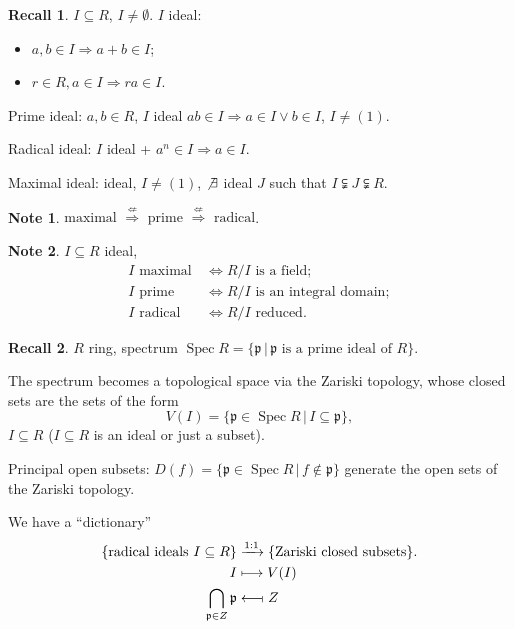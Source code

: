\documentclass[12pt]{article}
\DeclareMathOperator{\Spec}{Spec}
\theoremstyle{definition}
\newtheorem*{note}{Note}
\newtheorem*{recall}{Recall}
\theoremstyle{remark}
\begin{document}
\begin{recall}
$I\subseteq R$, $I\neq\emptyset$. $I$ ideal:
\begin{itemize}
\item $a,b\in I\Rightarrow a+b\in I$;
\item $r\in R,a\in I\Rightarrow ra\in I$.
\end{itemize}

Prime ideal: $a,b\in R$, $I$ ideal $ab\in I\Rightarrow a\in I\vee b\in I$, $I\neq(1)$.

Radical ideal: $I$ ideal + $a^n\in I\Rightarrow a\in I$.

Maximal ideal: ideal, $I\neq(1)$, $\not\exists$ ideal $J$ such that $I\subsetneqq J\subsetneqq R$.
\end{recall}

\begin{note}
$\text{maximal }\overset{\not\Leftarrow}{\Rightarrow}\text{ prime }\overset{\not\Leftarrow}{\Rightarrow}\text{ radical}$.
\end{note}

\begin{note}
$I\subseteq R$ ideal,
\begin{align*}
I\text{ maximal}\,&\Longleftrightarrow R/I\text{ is a field};\\
I\text{ prime}\,&\Longleftrightarrow R/I\text{ is an integral domain};\\
I\text{ radical}\,&\Longleftrightarrow R/I\text{ reduced}.
\end{align*}
\end{note}

\begin{recall}
$R$ ring, spectrum $\Spec R=\{\mathfrak{p}\,|\,\mathfrak{p}\text{ is a prime ideal of }R\}$.
\end{recall}

The spectrum becomes a topological space via the Zariski topology, whose closed sets are the sets of the form
\[V(I)=\{\mathfrak{p}\in\Spec R\,|\,I\subseteq\mathfrak{p}\},\]
$I\subseteq R$ ($I\subseteq R$ is an ideal or just a subset).

Principal open subsets: $D(f)=\{\mathfrak{p}\in\Spec R\,|\,f\notin\mathfrak{p}\}$ generate the open sets of the Zariski topology.

We have a ``dictionary''
\begin{align*}
\{\text{radical ideals }I\subseteq R\}&\xrightarrow{1:1}\{\text{Zariski closed subsets}\}.\\
I&\longmapsto V(I)\\
\bigcap_{\mathfrak{p}\in Z}\mathfrak{p}&\longleftarrow\!\shortmid Z
\end{align*}
\end{document}
